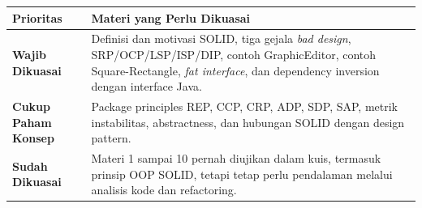 \begin{tabularx}{\textwidth}{|L{0.22\textwidth}|X|}
\hline
\textbf{Prioritas} & \textbf{Materi yang Perlu Dikuasai} \\
\hline
\textbf{Wajib Dikuasai} & Definisi dan motivasi SOLID, tiga gejala \textit{bad design}, SRP/OCP/LSP/ISP/DIP, contoh GraphicEditor, contoh Square-Rectangle, \textit{fat interface}, dan dependency inversion dengan interface Java. \\
\hline
\textbf{Cukup Paham Konsep} & Package principles REP, CCP, CRP, ADP, SDP, SAP, metrik instabilitas, abstractness, dan hubungan SOLID dengan design pattern. \\
\hline
\textbf{Sudah Dikuasai} & Materi 1 sampai 10 pernah diujikan dalam kuis, termasuk prinsip OOP SOLID, tetapi tetap perlu pendalaman melalui analisis kode dan refactoring. \\
\hline
\end{tabularx}
